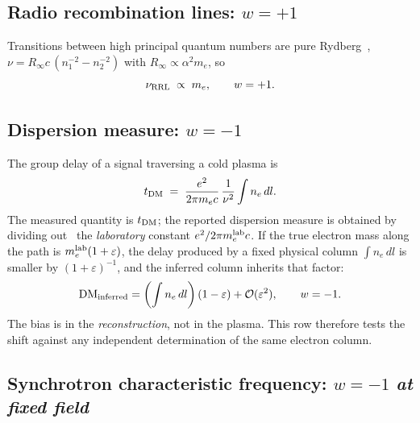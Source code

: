 \documentclass[aps,prd,twocolumn,superscriptaddress,nofootinbib,10pt]{revtex4-2}
\begin{document}
\subsection{Radio recombination lines: $w = +1$}

Transitions between high principal quantum numbers are pure Rydberg~\cite{GordonSorochenko2009},
$\nu = R_\infty c\,(n_1^{-2}-n_2^{-2})$ with $R_\infty \propto \alpha^{2} m_e$, so
%
\begin{equation}
  \nu_{\rm RRL} \;\propto\; m_e, \qquad w = +1 .
\end{equation}

\subsection{Dispersion measure: $w = -1$}

The group delay of a signal traversing a cold plasma is~\cite{LorimerKramer2004}
%
\begin{equation}
  t_{\rm DM} \;=\; \frac{e^{2}}{2\pi m_e c}\,\frac{1}{\nu^{2}} \int n_e \, dl .
  \label{eq:dm}
\end{equation}
%
The measured quantity is $t_{\rm DM}$; the reported dispersion measure is obtained by dividing
out~\cite{Kulkarni2020}
the \emph{laboratory} constant $e^{2}/2\pi m_e^{\rm lab}c$. If the true electron mass along the path
is $m_e^{\rm lab}(1+\varepsilon)$, the delay produced by a fixed physical column
$\int n_e\,dl$ is smaller by $(1+\varepsilon)^{-1}$, and the inferred column inherits that factor:
%
\begin{equation}
  \mathrm{DM}_{\rm inferred} = \left(\int n_e\,dl\right)(1-\varepsilon) + \mathcal{O}(\varepsilon^2),
  \qquad w = -1 .
\end{equation}
%
The bias is in the \emph{reconstruction}, not in the plasma. This row therefore tests the shift
against any independent determination of the same electron column.

\subsection{Synchrotron characteristic frequency: $w = -1$ \emph{at fixed field}}
\end{document}
